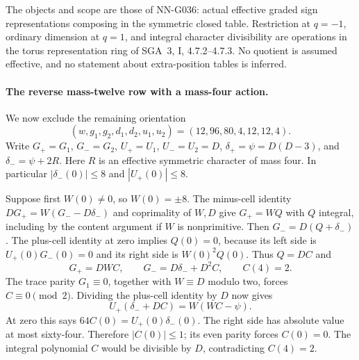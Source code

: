 The objects and scope are those of NN-G036: actual effective graded
sign representations composing in the symmetric closed table.
Restriction at $q=-1$, ordinary dimension at $q=1$, and integral
character divisibility are operations in the torus representation
ring of SGA~3, I, 4.7.2--4.7.3. No quotient is assumed effective,
and no statement about extra-position tables is inferred.

\paragraph{The reverse mass-twelve row with a mass-four action.}
We now exclude the remaining orientation
\[
 (w,g_1,g_2,d_1,d_2,u_1,u_2)
                  =(12,96,80,4,12,12,4).
\]
Write $G_+=G_1$, $G_-=G_2$, $U_+=U_1$, $U_-=U_2=D$,
$\delta_+=\psi=D(D-3)$, and $\delta_-=\psi+2R$.
Here $R$ is an effective symmetric character of mass four.
In particular $|\delta_-(0)|\le8$ and $|U_+(0)|\le8$.

Suppose first $W(0)\ne0$, so $W(0)=\pm8$.
The minus-cell identity
$DG_+=W(G_--D\delta_-)$ and coprimality of $W,D$
give $G_+=WQ$ with $Q$ integral, including by the content
argument if $W$ is nonprimitive.
Then $G_-=D(Q+\delta_-)$.
The plus-cell identity at zero implies $Q(0)=0$, because
its left side is $U_+(0)G_-(0)=0$ and its right side is
$W(0)^2Q(0)$.
Thus $Q=DC$ and
\[
 G_+=DWC,\qquad G_-=D\delta_-+D^2C,\qquad C(4)=2.
\]
The trace parity $G_1\equiv0$, together with $W\equiv D$
modulo two, forces $C\equiv0\pmod2$.
Dividing the plus-cell identity by $D$ now gives
\[
 U_+(\delta_-+DC)=W(WC-\psi).
\]
At zero this says
$64C(0)=U_+(0)\delta_-(0)$.
The right side has absolute value at most sixty-four.
Therefore $|C(0)|\le1$; its even parity forces $C(0)=0$.
The integral polynomial $C$ would be divisible by $D$,
contradicting $C(4)=2$.

